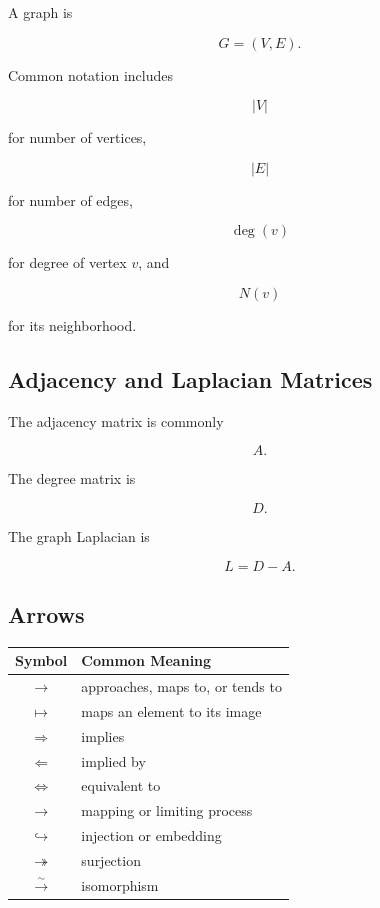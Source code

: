 A graph is

\[
\boxed{
G=(V,E).
}
\]

Common notation includes

\[
\boxed{
|V|
}
\]

for number of vertices,

\[
\boxed{
|E|
}
\]

for number of edges,

\[
\boxed{
\deg(v)
}
\]

for degree of vertex \(v\), and

\[
\boxed{
N(v)
}
\]

for its neighborhood.

\subsection{Adjacency and Laplacian Matrices}
\label{subsec:graph-matrix-symbols-reference}

The adjacency matrix is commonly

\[
\boxed{
A.
}
\]

The degree matrix is

\[
\boxed{
D.
}
\]

The graph Laplacian is

\[
\boxed{
L=D-A.
}
\]

\subsection{Arrows}
\label{subsec:mathematical-arrows-reference}

\begin{center}
\begin{tabular}{c|l}
\textbf{Symbol} & \textbf{Common Meaning} \\ \hline
\( \to \) & approaches, maps to, or tends to \\
\( \mapsto \) & maps an element to its image \\
\( \Rightarrow \) & implies \\
\( \Leftarrow \) & implied by \\
\( \Leftrightarrow \) & equivalent to \\
\( \longrightarrow \) & mapping or limiting process \\
\( \hookrightarrow \) & injection or embedding \\
\( \twoheadrightarrow \) & surjection \\
\( \xrightarrow{\sim} \) & isomorphism
\end{tabular}
\end{center}


